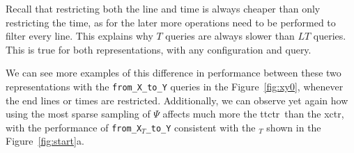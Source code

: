     Recall that restricting both the line and time is always cheaper than only restricting the time, as for the later more operations need to be performed to filter every line. This explains why $T$ queries are always slower than $LT$ queries. This is true for both representations, with any configuration and query.
    
    We can see more examples of this difference in performance between these two representations with the \texttt{from\_X\_to\_Y} queries in the Figure~\ref{fig:xy0}, whenever the end lines or times are restricted. Additionally, we can observe yet again how using the most sparse sampling of $\Psi$ affects much more the \gls{ttctr}~than the \gls{xctr}, with the performance of \texttt{from\_X$_{T}$\_to\_Y} consistent with the \texttt{\startX$_T$} shown in the Figure~\ref{fig:start}a.
    
